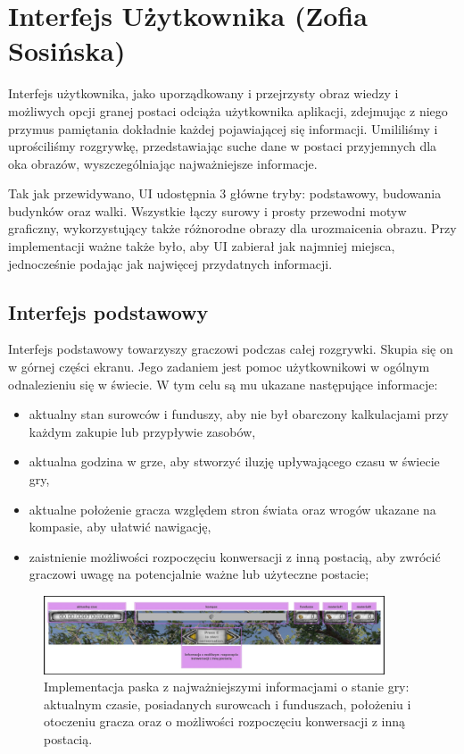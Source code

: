 \section{Interfejs Użytkownika (Zofia Sosińska)}\label{chap:ui_imp}
Interfejs użytkownika, jako uporządkowany i przejrzysty obraz wiedzy i możliwych opcji granej postaci odciąża użytkownika
aplikacji, zdejmując z niego przymus pamiętania dokładnie każdej pojawiającej się informacji. Umililiśmy i uprościliśmy 
rozgrywkę, przedstawiając suche dane w postaci przyjemnych dla oka obrazów, wyszczególniając najważniejsze informacje.

Tak jak przewidywano, UI udostępnia 3 główne tryby: podstawowy, budowania budynków oraz walki. Wszystkie łączy surowy 
i prosty przewodni motyw graficzny, wykorzystujący także różnorodne obrazy dla urozmaicenia obrazu. Przy implementacji ważne także było, aby UI zabierał jak najmniej miejsca, jednocześnie podając jak 
najwięcej przydatnych informacji.

\subsection{Interfejs podstawowy}
Interfejs podstawowy towarzyszy graczowi podczas całej rozgrywki. Skupia się on w górnej części ekranu. Jego zadaniem jest pomoc 
użytkownikowi w ogólnym odnalezieniu się w świecie. W tym celu są mu ukazane następujące informacje:
\begin{itemize}
    \item aktualny stan surowców i funduszy, aby nie był obarczony kalkulacjami przy każdym zakupie lub przypływie zasobów,
    \item aktualna godzina w grze, aby stworzyć iluzję upływającego czasu w świecie gry,
    \item aktualne położenie gracza względem stron świata oraz wrogów ukazane na kompasie, aby ułatwić nawigację,
    \item zaistnienie możliwości rozpoczęciu konwersacji z inną postacią, aby zwrócić graczowi uwagę na potencjalnie ważne lub użyteczne postacie;
\end{itemize}

\begin{figure}[htbp]
    \centering
    \includegraphics[width=0.9\textwidth]{images/ui/naszpasek.png}
    \caption{Implementacja paska z najważniejszymi informacjami o stanie gry: aktualnym czasie, posiadanych surowcach 
    i funduszach, położeniu i otoczeniu gracza oraz o możliwości rozpoczęciu konwersacji z inną postacią.
    }\label{fig:compass}
\end{figure}


